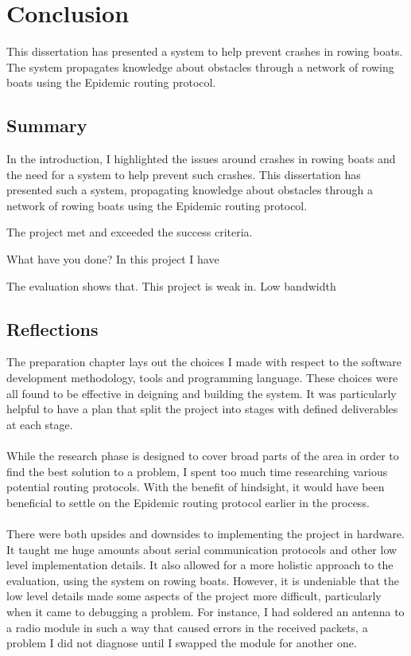 \documentclass[12pt,a4paper]{report}
\newcommand{\newchapter}[2]{
    \setcounter{chapter}{#1}
    \setcounter{section}{0}
    \chapter*{#2}
    \addcontentsline{toc}{chapter}{#1 #2}
}
\begin{document}
\newchapter{5}{Conclusion}
This dissertation has presented a system to help prevent crashes in rowing boats. The system propagates knowledge about obstacles through a network of rowing boats using the Epidemic routing protocol.

\section{Summary}
In the introduction, I highlighted the issues around crashes in rowing boats and the need for a system to help prevent such crashes. This dissertation has presented such a system, propagating knowledge about obstacles through a network of rowing boats using the Epidemic routing protocol. 

The project met and exceeded the success criteria.


What have you done?
In this project I have 

The evaluation shows that. This project is weak in. Low bandwidth

\section{Reflections}
The preparation chapter lays out the choices I made with respect to the software development methodology, tools and programming language. These choices were all found to be effective in deigning and building the system. It was particularly helpful to have a plan that split the project into stages with defined deliverables at each stage. \\ \\ 
While the research phase is designed to cover broad parts of the area in order to find the best solution to a problem, I spent too much time researching various potential routing protocols. With the benefit of hindsight, it would have been beneficial to settle on the Epidemic routing protocol earlier in the process. \\ \\
There were both upsides and downsides to implementing the project in hardware. It taught me huge amounts 
about serial communication protocols and other low level implementation details. It also allowed for a more holistic approach to the evaluation, using the system on rowing boats. However, it is undeniable that the low level details made some aspects of the project more difficult, particularly when it came to debugging a problem. For instance, I had soldered an antenna to a radio module in such a way that caused errors in the received packets, a problem I did not diagnose until I swapped the module for another one. 
\end{document}
